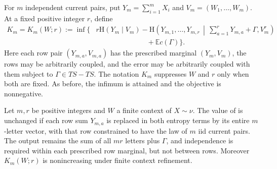 For $m$ independent current pairs, put
$Y_m=\sum_{i=1}^mX_i$ and $V_m=(W_1,\ldots,W_m)$.  At a fixed positive
integer $r$, define
\begin{equation}
\label{entropy-foundations:K-definition}
\begin{split}
 K_m=K_m(W;r):=\inf\bigg\{
 &r\mathrm H(Y_m\mid V_m)
 -\mathrm H\!\left(Y_{m,1},\ldots,Y_{m,r}\,\middle|\,
             \sum_{a=1}^rY_{m,a}+\Gamma,V_m^r\right)\\
 &\hspace{3cm}+\mathbb E c(\Gamma)\bigg\}.
\end{split}
\end{equation}
Here each row pair $(Y_{m,a},V_{m,a})$ has the prescribed marginal
$(Y_m,V_m)$, the rows may be arbitrarily coupled, and the error may be
arbitrarily coupled with them subject to $\Gamma\in TS-TS$.  The notation
$K_m$ suppresses $W$ and $r$ only when both are fixed.  As before, the
infimum is attained and the objective is nonnegative.

\begin{lemma}
\label{entropy-foundations:block-cost}
Let $m,r$ be positive integers and $W$ a finite context of $X\sim\nu$.
The value of  is unchanged if each
row sum $Y_{m,a}$ is replaced in both entropy terms by its entire
$m$-letter vector, with that row constrained to have the law of $m$ iid
current pairs.  The output remains the sum of all $mr$ letters plus
$\Gamma$, and independence is required within each prescribed row
marginal, but not between rows.  Moreover $K_m(W;r)$ is nonincreasing under
finite context refinement.
\end{lemma}

